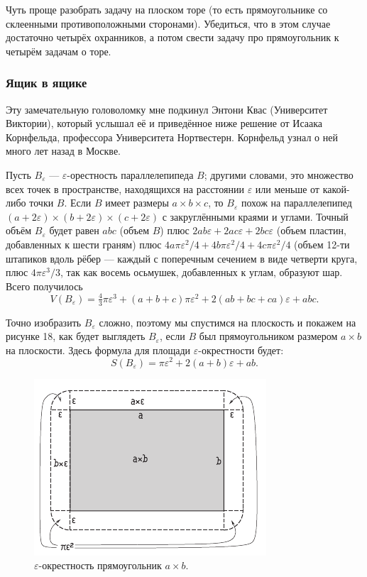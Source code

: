 \begin{addedbytheeditors}
Чуть проще разобрать задачу на плоском торе (то есть прямоугольнике со склеенными противоположными сторонами).
Убедиться, что в этом случае достаточно четырёх охранников, а потом свести задачу про прямоугольник к четырём задачам о торе.
\end{addedbytheeditors}



\subsubsection*{Ящик в ящике}

Эту замечательную головоломку мне подкинул Энтони Квас (Университет Виктории), который услышал её и приведённое ниже решение от Исаака Корнфельда, профессора Университета Нортвестерн.
Корнфельд узнал о ней много лет назад в Москве.

Пусть $B_\varepsilon$ --- $\varepsilon$-орестность параллелепипеда $B$;
другими словами, это множество всех точек в пространстве, находящихся на расстоянии $\varepsilon$ или меньше от какой-либо точки $B$.
Если $B$ имеет размеры $a \times b \times c$, то $B_\varepsilon$ похож на параллелепипед $(a + 2\varepsilon) \times (b + 2\varepsilon) \times (c + 2\varepsilon)$ с закруглёнными краями и углами.
Точный объём $B_\varepsilon$ будет равен $abc$ (объем $B$) плюс $2ab\varepsilon + 2ac\varepsilon + 2bc\varepsilon$ (объем пластин, добавленных к шести граням) плюс $4a\pi\varepsilon^2 /4 + 4b\pi\varepsilon^2 /4 + 4c\pi\varepsilon^2 /4$ (объем 12-ти штапиков вдоль рёбер --- каждый с поперечным сечением в виде четверти круга, плюс $4\pi\varepsilon^3 /3$, так как восемь осьмушек, добавленных к углам, образуют шар.
Всего получилось
\[V(B_\varepsilon)=\tfrac43\pi\varepsilon^3+(a+b+c)\pi\varepsilon^2+2(ab+bc+ca)\varepsilon+abc.\]

Точно изобразить $B_\varepsilon$ сложно, поэтому мы спустимся на плоскость и покажем на рисунке 18, как будет выглядеть $B_\varepsilon$, если $B$ был прямоугольником размером $a \times b$ на плоскости.
Здесь формула для площади $\varepsilon$-окрестности будет:
\[S(B_\varepsilon)=\pi\varepsilon^2+2(a+b)\varepsilon+ab.\]

\begin{figure}[ht!]
\centering
\includegraphics[scale=1]{pics/box}
\caption{$\varepsilon$-окрестность прямоугольник $a \times b$.}
\label{pic:box}
\end{figure}

